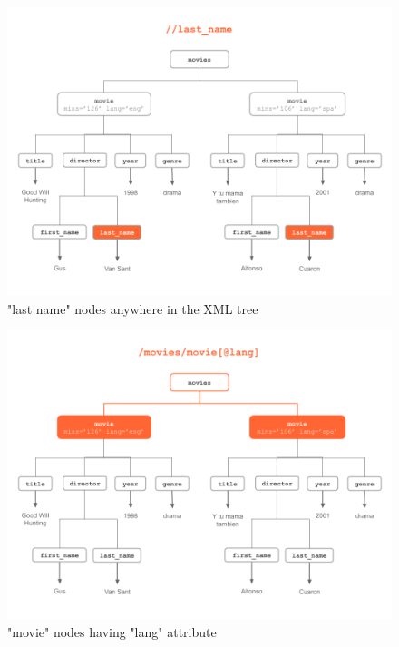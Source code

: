 \documentclass[
]{book}
\begin{document}
\begin{figure}

{\centering \includegraphics[width=0.85\linewidth]{images/xpath/xpath-example7} 

}

\caption{"last name" nodes anywhere in the XML tree}\label{fig:unnamed-chunk-57}
\end{figure}

\begin{figure}

{\centering \includegraphics[width=0.85\linewidth]{images/xpath/xpath-example8} 

}

\caption{"movie" nodes having "lang" attribute}\label{fig:unnamed-chunk-58}
\end{figure}
\end{document}
